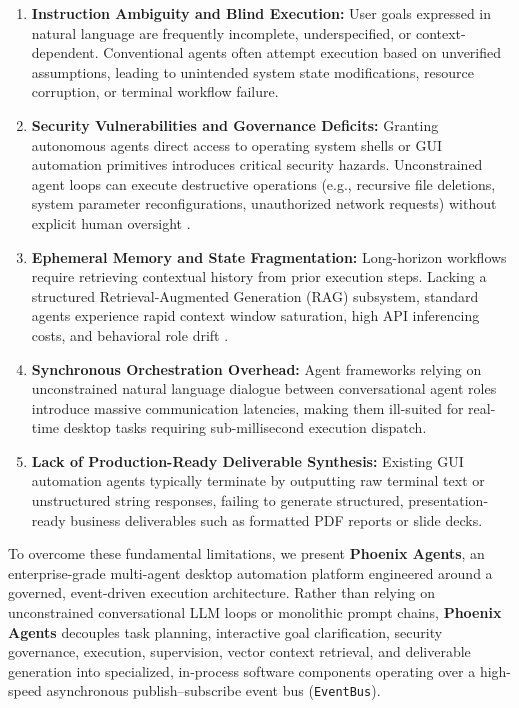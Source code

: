\documentclass[conference]{IEEEtran}
\begin{document}
\begin{enumerate}
    \item \textbf{Instruction Ambiguity and Blind Execution:} User goals expressed in natural language are frequently incomplete, underspecified, or context-dependent. Conventional agents often attempt execution based on unverified assumptions, leading to unintended system state modifications, resource corruption, or terminal workflow failure.
    \item \textbf{Security Vulnerabilities and Governance Deficits:} Granting autonomous agents direct access to operating system shells or GUI automation primitives introduces critical security hazards. Unconstrained agent loops can execute destructive operations (e.g., recursive file deletions, system parameter reconfigurations, unauthorized network requests) without explicit human oversight \cite{guo2026}.
    \item \textbf{Ephemeral Memory and State Fragmentation:} Long-horizon workflows require retrieving contextual history from prior execution steps. Lacking a structured Retrieval-Augmented Generation (RAG) subsystem, standard agents experience rapid context window saturation, high API inferencing costs, and behavioral role drift \cite{wang2026}.
    \item \textbf{Synchronous Orchestration Overhead:} Agent frameworks relying on unconstrained natural language dialogue between conversational agent roles introduce massive communication latencies, making them ill-suited for real-time desktop tasks requiring sub-millisecond execution dispatch.
    \item \textbf{Lack of Production-Ready Deliverable Synthesis:} Existing GUI automation agents typically terminate by outputting raw terminal text or unstructured string responses, failing to generate structured, presentation-ready business deliverables such as formatted PDF reports or slide decks.
\end{enumerate}

To overcome these fundamental limitations, we present \textbf{Phoenix Agents}, an enterprise-grade multi-agent desktop automation platform engineered around a governed, event-driven execution architecture. Rather than relying on unconstrained conversational LLM loops or monolithic prompt chains, \textbf{Phoenix Agents} decouples task planning, interactive goal clarification, security governance, execution, supervision, vector context retrieval, and deliverable generation into specialized, in-process software components operating over a high-speed asynchronous publish--subscribe event bus (\texttt{EventBus}).
\end{document}

